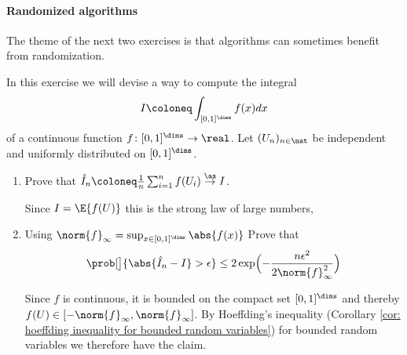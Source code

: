 \begin{exercise}
    \label{ex: convex conjugate}
    
\end{exercise}

\paragraph*{Randomized algorithms} The theme of the
next two exercises is that algorithms can sometimes benefit from randomization.

\begin{exercise}
    \label{ex: monte carlo}
    In this exercise we will devise a way to compute the integral
    \[
        I \coloneq \int_{[0,1]^\dims} f(x) dx
    \]
    of a continuous function \(f\colon [0,1]^\dims \to \real\).  Let
    \((U_n)_{n\in \nat}\) be independent and uniformly distributed on
    \([0,1]^\dims\).
    \begin{enumerate}[label=(\alph*), noitemsep]
        \item Prove that \(\hat I_n \coloneq \frac1n\sum_{i=1}^n f(U_i) \overset\as\to I\).
        \begin{solution}
            Since \(I= \E{f(U)}\) this is the strong law of large numbers,
        \end{solution}

        \item Using \(\norm{f}_\infty = \sup_{x\in [0,1]^\dims} \abs{f(x)}\) Prove that
        \[
            \prob[\big]{\abs{\hat I_n - I} > \epsilon} \le 2\exp\Bigl(-\frac{n \epsilon^2}{2\norm{f}_\infty^2}\Bigr)
        \]
        \begin{solution}
            Since \(f\) is continuous, it is bounded on the compact set \([0,1]^\dims\)
            and thereby \(f(U) \in [-\norm{f}_\infty, \norm{f}_\infty]\).
            By Hoeffding's inequality (Corollary \ref{cor: hoeffding inequality for bounded random variables})
            for bounded random variables we therefore have the claim.
        \end{solution}


\end{enumerate}
\end{exercise}
